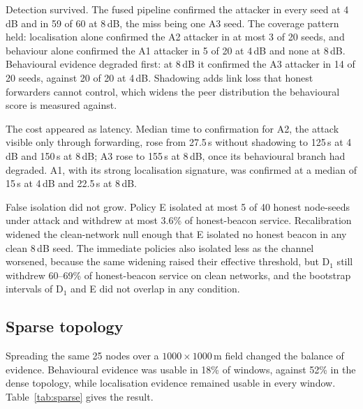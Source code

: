 Detection survived. The fused pipeline confirmed the attacker in every seed at
4\,dB and in 59 of 60 at 8\,dB, the miss being one A3 seed. The coverage
pattern held: localisation alone confirmed the A2 attacker in at most 3 of 20
seeds, and behaviour alone confirmed the A1 attacker in 5 of 20 at 4\,dB and
none at 8\,dB. Behavioural evidence degraded first: at 8\,dB it confirmed the
A3 attacker in 14 of 20 seeds, against 20 of 20 at 4\,dB. Shadowing adds link
loss that honest forwarders cannot control, which widens the peer distribution
the behavioural score is measured against.

The cost appeared as latency. Median time to confirmation for A2, the attack
visible only through forwarding, rose from 27.5\,s without shadowing to
125\,s at 4\,dB and 150\,s at 8\,dB; A3 rose to 155\,s at 8\,dB, once its
behavioural branch had degraded. A1, with its strong localisation signature,
was confirmed at a median of 15\,s at 4\,dB and 22.5\,s at 8\,dB.

False isolation did not grow. Policy E isolated at most 5 of 40 honest
node-seeds under attack and withdrew at most 3.6\% of honest-beacon service.
Recalibration widened the clean-network null enough that E isolated no honest
beacon in any clean 8\,dB seed. The immediate policies also isolated less as
the channel worsened, because the same widening raised their effective
threshold, but D$_1$ still withdrew 60--69\% of honest-beacon service on clean
networks, and the bootstrap intervals of D$_1$ and E did not overlap in any
condition.

\subsection{Sparse topology}
\label{sec:sparse}

Spreading the same 25 nodes over a $1000 \times 1000$\,m field changed the
balance of evidence. Behavioural evidence was usable in 18\% of windows,
against 52\% in the dense topology, while localisation evidence remained
usable in every window. Table~\ref{tab:sparse} gives the result.

